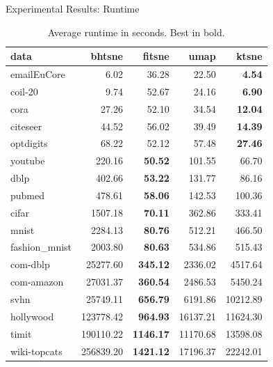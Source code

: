 \documentclass{beamer}
\begin{document}
\begin{frame}[fragile]{Experimental Results: Runtime}
\fontsize{8pt}{7.9}\selectfont
\begin{table}[tb]
  \centering
  \begin{tabular}{lrrrr}
    \toprule
data & bhtsne & fitsne & umap & ktsne \\ \midrule
emailEuCore & 6.02 & 36.28 & 22.50 & \bfseries 4.54 \\
coil-20 & 9.74 & 52.67 & 24.16 & \bfseries 6.90 \\
cora & 27.26 & 52.10 & 34.54 & \bfseries 12.04 \\
citeseer & 44.52 & 56.02 & 39.49 & \bfseries 14.39 \\
optdigits & 68.22 & 52.12 & 57.48 & \bfseries 27.46 \\
youtube & 220.16 & \bfseries 50.52 & 101.55 & 66.70 \\
dblp & 402.66 & \bfseries 53.22 & 131.77 & 86.16 \\
pubmed & 478.61 & \bfseries 58.06 & 142.53 & 100.36 \\
cifar & 1507.18 & \bfseries 70.11 & 362.86 & 333.41 \\
mnist & 2284.13 & \bfseries 80.76 & 512.21 & 466.50 \\
fashion\_mnist & 2003.80 & \bfseries 80.63 & 534.86 & 515.43 \\
com-dblp & 25277.60 & \bfseries 345.12 & 2336.02 & 4517.64 \\
com-amazon & 27031.37 & \bfseries 360.54 & 2486.53 & 5450.24 \\
svhn & 25749.11 & \bfseries 656.79 & 6191.86 & 10212.89 \\
hollywood & 123778.42 & \bfseries 964.93 & 16137.21 & 11624.30 \\
timit & 190110.22 & \bfseries 1146.17 & 11170.68 & 13598.08 \\
wiki-topcats & 256839.20 & \bfseries 1421.12 & 17196.37 & 22242.01 \\
\bottomrule
  \end{tabular}
  \caption{Average runtime in seconds. Best in bold.}
\label{tab:comp}
\end{table}
\end{frame}
\end{document}
